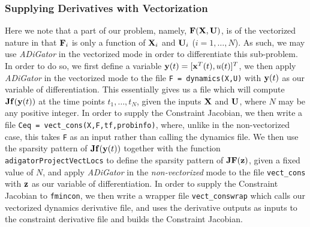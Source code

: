 \documentclass[10pt,pdftex]{article}
\begin{document}
\subsubsection*{Supplying Derivatives with Vectorization}
Here we note that a part of our problem, namely, $\mathbf{F}(\mathbf{X},\mathbf{U})$, is of the vectorized nature in that $\mathbf{F}_i$ is only a function of $\mathbf{X}_i$ and $\mathbf{U}_i$ ($i = 1,\dots,N$). As such, we may use \emph{ADiGator} in the vectorized mode in order to differentiate this sub-problem. In order to do so, we first define a variable $\mathbf{y}(t) = [\mathbf{x}^T(t),u(t)]^T$, we then apply \emph{ADiGator} in the vectorized mode to the file \texttt{F = dynamics(X,U)} with $\mathbf{y}(t)$ as our variable of differentiation. This essentially gives us a file which will compute $\mathbf{J}\mathbf{f}(\mathbf{y}(t))$ at the time points $t_1,\dots,t_N$, given the inputs $\mathbf{X}$ and $\mathbf{U}$, where $N$ may be any positive integer. In order to supply the Constraint Jacobian, we then write a file \texttt{Ceq = vect\_cons(X,F,tf,probinfo)}, where, unlike in the non-vectorized case, this takes \texttt{F} as an input rather than calling the dynamics file. We then use the sparsity pattern of $\mathbf{J}\mathbf{f}(\mathbf{y}(t))$ together with the function \texttt{adigatorProjectVectLocs} to define the sparsity pattern of $\mathbf{J}\mathbf{F}(\mathbf{z})$, given a fixed value of $N$, and apply \emph{ADiGator} in the \emph{non-vectorized} mode to the file \texttt{vect\_cons} with $\mathbf{z}$ as our variable of differentiation. In order to supply the Constraint Jacobian to \texttt{fmincon}, we then write a wrapper file \texttt{vect\_conswrap} which calls our vectorized dynamics derivative file, and uses the derivative outputs as inputs to the constraint derivative file and builds the Constraint Jacobian.
\end{document}
